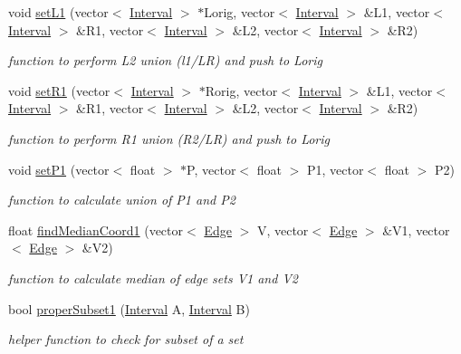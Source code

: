 \begin{DoxyCompactItemize}
void \hyperlink{classisorect_a0c292396ca5de5692da4130819e1edba}{set\+L1} (vector$<$ \hyperlink{classInterval}{Interval} $>$ $\ast$Lorig, vector$<$ \hyperlink{classInterval}{Interval} $>$ \&L1, vector$<$ \hyperlink{classInterval}{Interval} $>$ \&R1, vector$<$ \hyperlink{classInterval}{Interval} $>$ \&L2, vector$<$ \hyperlink{classInterval}{Interval} $>$ \&R2)
\begin{DoxyCompactList}\small\item\em function to perform L2 union (l1/\+LR) and push to Lorig \end{DoxyCompactList}\item 
void \hyperlink{classisorect_af829250d2d043fde4d8356cb68076823}{set\+R1} (vector$<$ \hyperlink{classInterval}{Interval} $>$ $\ast$Rorig, vector$<$ \hyperlink{classInterval}{Interval} $>$ \&L1, vector$<$ \hyperlink{classInterval}{Interval} $>$ \&R1, vector$<$ \hyperlink{classInterval}{Interval} $>$ \&L2, vector$<$ \hyperlink{classInterval}{Interval} $>$ \&R2)
\begin{DoxyCompactList}\small\item\em function to perform R1 union (R2/\+LR) and push to Lorig \end{DoxyCompactList}\item 
void \hyperlink{classisorect_af3fb03a32b2c833d32ed610f0b260071}{set\+P1} (vector$<$ float $>$ $\ast$P, vector$<$ float $>$ P1, vector$<$ float $>$ P2)
\begin{DoxyCompactList}\small\item\em function to calculate union of P1 and P2 \end{DoxyCompactList}\item 
\mbox{\label{classisorect_a82bd808dcca448ce35645d2af0e13596}} 
float \hyperlink{classisorect_a82bd808dcca448ce35645d2af0e13596}{find\+Median\+Coord1} (vector$<$ \hyperlink{classEdge}{Edge} $>$ V, vector$<$ \hyperlink{classEdge}{Edge} $>$ \&V1, vector$<$ \hyperlink{classEdge}{Edge} $>$ \&V2)
\begin{DoxyCompactList}\small\item\em function to calculate median of edge sets V1 and V2 \end{DoxyCompactList}\item 
bool \hyperlink{classisorect_a6382fc3ab9d83e36fcb572b1a615fd5f}{proper\+Subset1} (\hyperlink{classInterval}{Interval} A, \hyperlink{classInterval}{Interval} B)
\begin{DoxyCompactList}\small\item\em helper function to check for subset of a set \end{DoxyCompactList}\item 

\end{DoxyCompactItemize}
